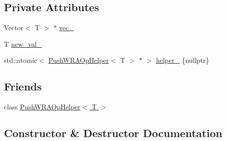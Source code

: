 \subsection*{Private Attributes}
\begin{DoxyCompactItemize}
\item 
Vector$<$ T $>$ $\ast$ \hyperlink{classtervel_1_1containers_1_1wf_1_1vector_1_1_push_w_r_a_op_ae68e6c5e445fcf86aee12bc6e2d1f6bf}{vec\+\_\+}
\item 
T \hyperlink{classtervel_1_1containers_1_1wf_1_1vector_1_1_push_w_r_a_op_adf7e228b9e370014c79aec8a628a6cb8}{new\+\_\+val\+\_\+}
\item 
std\+::atomic$<$ \hyperlink{classtervel_1_1containers_1_1wf_1_1vector_1_1_push_w_r_a_op_helper}{Push\+W\+R\+A\+Op\+Helper}$<$ T $>$ $\ast$ $>$ \hyperlink{classtervel_1_1containers_1_1wf_1_1vector_1_1_push_w_r_a_op_a11858ec4a2c535d4c7a638b701b1011e}{helper\+\_\+} \{nullptr\}
\end{DoxyCompactItemize}
\subsection*{Friends}
\begin{DoxyCompactItemize}
\item 
class \hyperlink{classtervel_1_1containers_1_1wf_1_1vector_1_1_push_w_r_a_op_af5b4dff870a0a3fb9ebf7b76ab2143f1}{Push\+W\+R\+A\+Op\+Helper$<$ T $>$}
\end{DoxyCompactItemize}


\subsection{Constructor \& Destructor Documentation}
\hypertarget{classtervel_1_1containers_1_1wf_1_1vector_1_1_push_w_r_a_op_a404988cf99e2e7c243554bf89724aa55}{}
